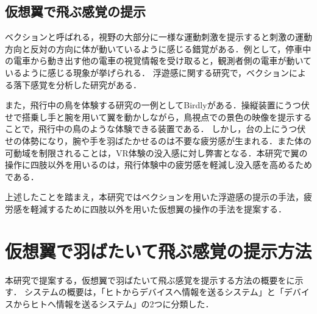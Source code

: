 \begin{small}


  

  \subsection{仮想翼で飛ぶ感覚の提示}


    ベクションと呼ばれる，視野の大部分に一様な運動刺激を提示すると刺激の運動方向と反対の方向に体が動いているように感じる錯覚がある\cite{妹尾武治2014ベクションとその周辺の近年の動向}．例として，停車中の電車から動き出す他の電車の視覚情報を受け取ると，観測者側の電車が動いているように感じる現象が挙げられる．
    浮遊感に関する研究で，ベクションによる落下感覚を分析した研究がある\cite{奥川夏輝2017VR空間における視覚刺激によって発生する落下感覚の分析}．

    また，飛行中の鳥を体験する研究の一例としてBirdly\cite{rheiner2014birdly}がある．操縦装置にうつ伏せで搭乗し手と腕を用いて翼を動かしながら，鳥視点での景色の映像を提示することで，飛行中の鳥のような体験できる装置である．
    しかし，台の上にうつ伏せの体勢になり，腕や手を羽ばたかせるのは不要な疲労感が生まれる．また体の可動域を制限されることは，VR体験の没入感に対し弊害となる．本研究で翼の操作に四肢以外を用いるのは，飛行体験中の疲労感を軽減し没入感を高めるためである．


    上述したことを踏まえ，本研究ではベクションを用いた浮遊感の提示の手法，疲労感を軽減するために四肢以外を用いた仮想翼の操作の手法を提案する．

  
\section{仮想翼で羽ばたいて飛ぶ感覚の提示方法}
  本研究で提案する，仮想翼で羽ばたいて飛ぶ感覚を提示する方法の概要をに示す．
  システムの概要は，「ヒトからデバイスへ情報を送るシステム」と「デバイスからヒトへ情報を送るシステム」の2つに分類した．
  

\end{small}
